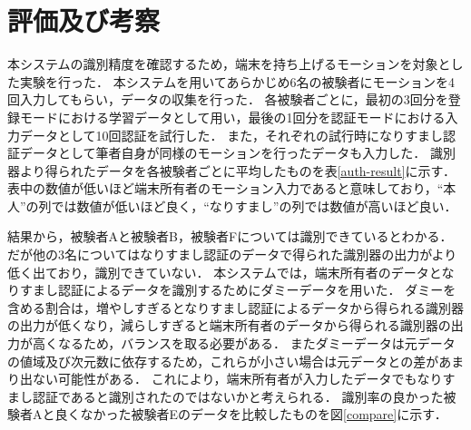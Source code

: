 \section{評価及び考察}
本システムの識別精度を確認するため，端末を持ち上げるモーションを対象とした実験を行った．
本システムを用いてあらかじめ6名の被験者にモーションを4回入力してもらい，データの収集を行った．
各被験者ごとに，最初の3回分を登録モードにおける学習データとして用い，最後の1回分を認証モードにおける入力データとして10回認証を試行した．
また，それぞれの試行時になりすまし認証データとして筆者自身が同様のモーションを行ったデータも入力した．
識別器より得られたデータを各被験者ごとに平均したものを表\ref{auth-result}に示す．
表中の数値が低いほど端末所有者のモーション入力であると意味しており，``本人''の列では数値が低いほど良く，``なりすまし''の列では数値が高いほど良い．

結果から，被験者Aと被験者B，被験者Fについては識別できているとわかる．
だが他の3名についてはなりすまし認証のデータで得られた識別器の出力がより低く出ており，識別できていない．
本システムでは，端末所有者のデータとなりすまし認証によるデータを識別するためにダミーデータを用いた．
ダミーを含める割合は，増やしすぎるとなりすまし認証によるデータから得られる識別器の出力が低くなり，減らしすぎると端末所有者のデータから得られる識別器の出力が高くなるため，バランスを取る必要がある．
またダミーデータは元データの値域及び次元数に依存するため，これらが小さい場合は元データとの差があまり出ない可能性がある．
これにより，端末所有者が入力したデータでもなりすまし認証であると識別されたのではないかと考えられる．
識別率の良かった被験者Aと良くなかった被験者Eのデータを比較したものを図\ref{compare}に示す．

